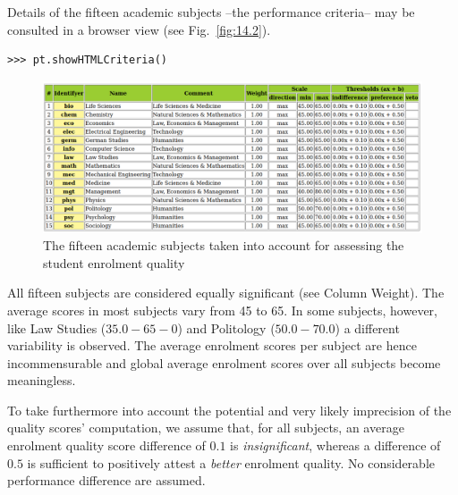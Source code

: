 Details of the fifteen academic subjects --the performance criteria-- may be consulted in a browser view (see Fig.~\vref{fig:14.2}).
\begin{lstlisting}
>>> pt.showHTMLCriteria()
\end{lstlisting}
\begin{figure}[ht]
\includegraphics[width=\hsize]{Figures/14-2-spiegelCriteria.png}
\caption[Fifteen popular academic subjects]{The fifteen academic subjects taken into account for assessing the student enrolment quality}
\label{fig:14.2}       %
\end{figure}

All fifteen subjects are considered equally significant (see Column Weight). The average scores in most subjects vary from 45 to 65. In some subjects, however, like Law Studies ($35.0 - 65-0$) and Politology ($50.0 - 70.0$) a different variability is observed. The average enrolment scores per subject are hence incommensurable and global average enrolment scores over all subjects become meaningless. 

To take furthermore into account the potential and very likely imprecision of the quality scores' computation, we assume that, for all subjects, an average enrolment quality score difference of $0.1$ is \emph{insignificant}, whereas a difference of $0.5$ is sufficient to positively attest a \emph{better} enrolment quality. No considerable performance difference are assumed.

